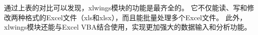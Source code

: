 通过上表的对比可以发现，xlwings模块的功能是最齐全的。
它不仅能读、写和修改两种格式的Excel文件（xls和xlsx），而且能批量处理多个Excel文件。
此外，xlwings模块还能与Excel VBA结合使用，实现更加强大的数据输入和分析功能。



















